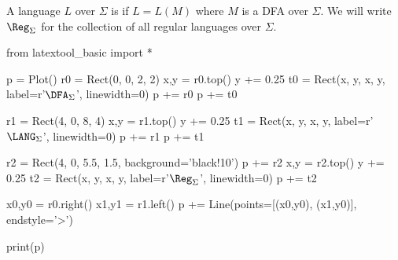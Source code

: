 \begin{defn}
A language $L$ over $\Sigma$
is  if $L = L(M)$ where $M$ is a DFA over $\Sigma$.
We will write $\Reg_\Sigma$ for the collection of all 
regular languages over $\Sigma$.
\end{defn}

\begin{python}
from latextool_basic import *

p = Plot()
r0 = Rect(0, 0, 2, 2)
x,y = r0.top()
y += 0.25
t0 = Rect(x, y, x, y, label=r'$\DFA_\Sigma$', linewidth=0)
p += r0
p += t0

r1 = Rect(4, 0, 8, 4)
x,y = r1.top()
y += 0.25
t1 = Rect(x, y, x, y, label=r'$\LANG_\Sigma$', linewidth=0)
p += r1
p += t1

r2 = Rect(4, 0, 5.5, 1.5, background='black!10')
p += r2
x,y = r2.top()
y += 0.25
t2 = Rect(x, y, x, y, label=r'$\Reg_\Sigma$', linewidth=0)
p += t2


x0,y0 = r0.right()
x1,y1 = r1.left()
p += Line(points=[(x0,y0), (x1,y0)], endstyle='>')

print(p)
\end{python}

